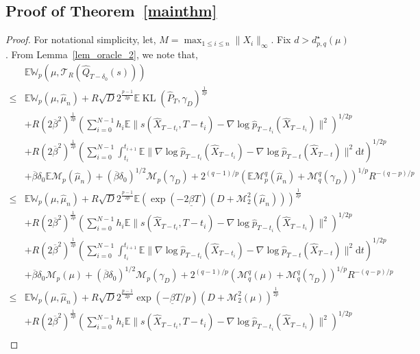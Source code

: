 \documentclass[12pts]{article}
\newcommand{\diff}{\mathrm{d}}
\newcommand{\sM}{ \mathscr{M}}
\newcommand{\sT}{ \mathscr{T}}
\newcommand{\hP}{ \hat{P}}
\newcommand{\hQ}{ \hat{Q}}
\newcommand{\hX}{ \widehat{X}}
\newcommand{\hmu}{\hat{\mu}}
\newcommand{\E}{\mathbb{E}}
\newcommand{\fW}{\mathbb{W}}
\newcommand{\hp}{\hat{p}}
\newcommand{\kl}{\operatorname{KL}}
\begin{document}
\subsection{Proof of Theorem~\ref{mainthm}}
\mainthm*
\begin{proof}
For notational simplicity, let, $M = \max_{1 \le i \le n}\|X_i\|_\infty$. Fix $d > d^\star_{p,q}(\mu)$. From Lemma~\ref{lem_oracle_2}, we note that, 
\begingroup
\allowdisplaybreaks
\begin{align}
    & \E \fW_p(\mu, \sT_R(\hQ_{T-\delta_0}(s))) \nonumber\\
    \le & \E \fW_p(\mu, \hmu_n) + R \sqrt{D} 2^{\frac{p-1}{2p}} \E \kl(\hP_T, \gamma_D)^{\frac{1}{2p}} \nonumber\\
    & + R (2\overline{\beta}^2 )^{\frac{1}{2p}} \left(\sum_{i=0}^{N-1} h_i \E \|s(\hX_{T-t_i}, T-t_i) - \nabla \log \hp_{T-t_i}(\hX_{T-t_i})\|^2 \right)^{1/2p} \nonumber\\
        & + R (2\overline{\beta}^2 )^{\frac{1}{2p}} \left(\sum_{i=0}^{N-1}\int_{t_i}^{t_{i+1}} \E\|\nabla \log \hp_{T-t_i}(\hX_{T-t_i}) - \nabla \log \hp_{T-t}(\hX_{T-t})\|^2 \diff  t\right)^{1/2p} \nonumber\\
        & +  \overline{\beta}\delta_0 \E \sM_p(\hmu_n) + (\overline{\beta}\delta_0)^{1/2} \sM_p(\gamma_D)  + 2^{(q-1)/p} \left( \E \sM_p^q(\hmu_n) +   \sM_q^q(\gamma_D) \right)^{1/p} R^{-(q-p)/p} \nonumber\\
        \le & \E \fW_p(\mu, \hmu_n) + R \sqrt{D} 2^{\frac{p-1}{2p}} \E \left(\exp\left(-2\underline{\beta}T\right) (D + \sM_2^2(\hmu_n))\right)^{\frac{1}{2p}} \label{ea42}\\
        & + R (2\overline{\beta}^2 )^{\frac{1}{2p}} \left(\sum_{i=0}^{N-1} h_i \E \|s(\hX_{T-t_i}, T-t_i) - \nabla \log \hp_{T-t_i}(\hX_{T-t_i})\|^2 \right)^{1/2p} \nonumber\\
        & + R (2\overline{\beta}^2 )^{\frac{1}{2p}} \left(\sum_{i=0}^{N-1}\int_{t_i}^{t_{i+1}} \E\|\nabla \log \hp_{T-t_i}(\hX_{T-t_i}) - \nabla \log \hp_{T-t}(\hX_{T-t})\|^2 \diff  t\right)^{1/2p} \nonumber\\
        & +  \overline{\beta}\delta_0  \sM_p(\mu) + (\overline{\beta}\delta_0)^{1/2} \sM_p(\gamma_D) + 2^{(q-1)/p} \left( \sM_q^q(\mu) +   \sM_q^q(\gamma_D) \right)^{1/p} R^{-(q-p)/p} \nonumber\\
        \le & \E \fW_p(\mu, \hmu_n) + R \sqrt{D} 2^{\frac{p-1}{2p}} \exp\left(-\underline{\beta}T/p\right) (D + \sM_2^2(\mu))^{\frac{1}{2p}} \label{ea4}\\
        & + R (2\overline{\beta}^2 )^{\frac{1}{2p}} \left(\sum_{i=0}^{N-1} h_i \E \|s(\hX_{T-t_i}, T-t_i) - \nabla \log \hp_{T-t_i}(\hX_{T-t_i})\|^2 \right)^{1/2p} \nonumber\\

\end{align}
\end{proof}
\end{document}
